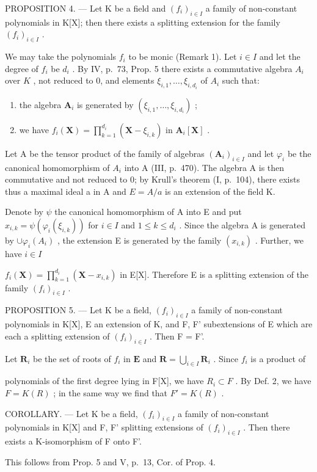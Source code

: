 PROPOSITION 4. --- Let K be a field and \((f_{i})_{i\in I}\) a family of non-constant polynomials in K{[}X{]}; then there exists a splitting extension for the family \((f_{i})_{i\in I}\) .

We may take the polynomials \(f_{i}\) to be monic (Remark 1). Let \(i \in I\) and let the degree of \(f_{i}\) be \(d_{i}\) . By IV, p.~73, Prop. 5 there exists a commutative algebra \(A_{i}\) over \(K\) , not reduced to 0, and elements \(\xi_{i,1}, \ldots, \xi_{i,d_{i}}\) of \(A_{i}\) such that:

\begin{enumerate}
\def\labelenumi{\alph{enumi})}
\item
  the algebra \(\mathbf{A}_i\) is generated by \((\xi_{i,1},\dots,\xi_{i,d_i})\) ;
\item
  we have \(f_{i}(\mathbf{X}) = \prod_{k=1}^{d_{i}} (\mathbf{X} - \xi_{i,k})\) in \(\mathbf{A}_i[\mathbf{X}]\) .
\end{enumerate}

Let A be the tensor product of the family of algebras \((\mathbf{A}_{i})_{i\in I}\) and let \(\varphi_{i}\) be the canonical homomorphism of \(A_{i}\) into A (III, p.~470). The algebra A is then commutative and not reduced to 0; by Krull's theorem (I, p.~104), there exists thus a maximal ideal a in A and \(E = A/a\) is an extension of the field K.

Denote by \(\psi\) the canonical homomorphism of A into E and put \(x_{i,k} = \psi (\varphi_i(\xi_{i,k}))\) for \(i\in I\) and \(1\leqslant k\leqslant d_i\) . Since the algebra A is generated by \(\cup \varphi_i(A_i)\) , the extension E is generated by the family \((x_{i,k})\) . Further, we have \(i\in I\)

\(f_{i}(\mathbf{X}) = \prod_{k=1}^{d_{i}} (\mathbf{X} - x_{i,k})\) in E{[}X{]}. Therefore E is a splitting extension of the family \((f_{i})_{i \in I}\) .

PROPOSITION 5. --- Let K be a field, \((f_i)_{i \in I}\) a family of non-constant polynomials in K{[}X{]}, E an extension of K, and F, F' subextensions of E which are each a splitting extension of \((f_i)_{i \in I}\) . Then F = F'.

Let \(\mathbf{R}_i\) be the set of roots of \(f_i\) in \(\mathbf{E}\) and \(\mathbf{R} = \bigcup_{i\in I}\mathbf{R}_i\) . Since \(f_i\) is a product of

polynomials of the first degree lying in F{[}X{]}, we have \(R_{i} \subset F\) . By Def. 2, we have \(F = K(R)\) ; in the same way we find that \(F' = K(R)\) .

COROLLARY. --- Let K be a field, \((f_{i})_{i\in I}\) a family of non-constant polynomials in K{[}X{]} and F, F' splitting extensions of \((f_{i})_{i\in I}\) . Then there exists a K-isomorphism of F onto F'.

This follows from Prop. 5 and V, p.~13, Cor. of Prop. 4.

